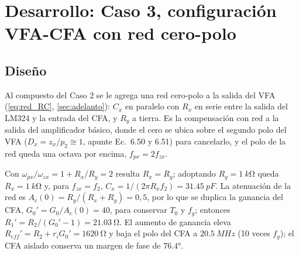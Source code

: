 \section{Desarrollo: Caso 3, configuración VFA-CFA con red cero-polo}
\label{sec:desarrollo_c3}

\subsection{Diseño}
\label{sec:diseno_c3}

Al compuesto del Caso 2 se le agrega una red cero-polo a la salida del VFA (\autoref{eq:red_RC}, \autoref{sec:adelanto}): $C_x$ en paralelo con $R_x$ en serie entre la salida del LM324 y la entrada del CFA, y $R_y$ a tierra. Es la compensación con red a la salida del amplificador básico, donde el cero se ubica sobre el segundo polo del VFA ($D_x = z_x/p_2 \cong 1$, apunte Ec.~6.50 y 6.51) para cancelarlo, y el polo de la red queda una octava por encima, $f_{px} = 2f_{zx}$.

Con $\omega_{px}/\omega_{zx} = 1 + R_x/R_y = 2$ resulta $R_x = R_y$; adoptando $R_y = \SI{1}{k\ohm}$ queda $R_x = \SI{1}{k\ohm}$ y, para $f_{zx} = f_2$, $C_x = 1/(2\pi R_xf_2) = \SI{31,45}{pF}$. La atenuación de la red es $A_c(0) = R_y/(R_x+R_y) = 0{,}5$, por lo que se duplica la ganancia del CFA, $G_0' = G_0/A_c(0) = 40$, para conservar $T_0$ y $f_g$; entonces $R_1' = R_2/(G_0'-1) = \SI{21,03}{\ohm}$. El aumento de ganancia eleva $R_{eff}' = R_2 + r_iG_0' = \SI{1620}{\ohm}$ y baja el polo del CFA a $\SI{20,5}{MHz}$ (10 veces $f_g$); el CFA aislado conserva un margen de fase de $\ang{76,4}$.

